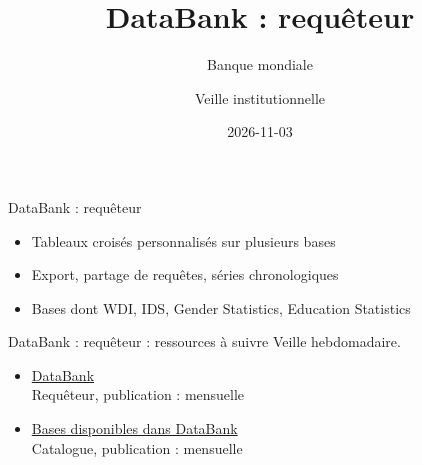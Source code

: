 \documentclass[aspectratio=169,11pt]{beamer}
\title{DataBank : requêteur}
\subtitle{Banque mondiale}
\author{Veille institutionnelle}
\date{2026-11-03}
\begin{document}
\begin{frame}\titlepage\end{frame}

\begin{frame}{DataBank : requêteur}
\begin{itemize}
\item Tableaux croisés personnalisés sur plusieurs bases
\item Export, partage de requêtes, séries chronologiques
\item Bases dont WDI, IDS, Gender Statistics, Education Statistics
\end{itemize}
\end{frame}

\begin{frame}{DataBank : requêteur : ressources à suivre}
\small
Veille hebdomadaire.
\begin{itemize}
\item \href{https://databank.worldbank.org}{DataBank}\\{\footnotesize Requêteur, publication : mensuelle}
\item \href{https://databank.worldbank.org/databases}{Bases disponibles dans DataBank}\\{\footnotesize Catalogue, publication : mensuelle}
\end{itemize}
\end{frame}
\end{document}
